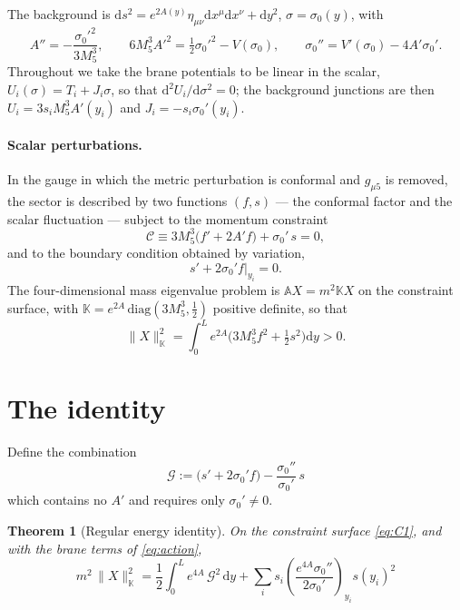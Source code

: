 \documentclass[11pt,a4paper]{article}
\newtheorem{theorem}{Theorem}
\newcommand{\Gcal}{\mathcal{G}}
\newcommand{\dd}{\mathrm{d}}
\newcommand{\sig}{\sigma_0}
\begin{document}
The background is
$\dd s^2=e^{2A(y)}\eta_{\mu\nu}\dd x^\mu \dd x^\nu+\dd y^2$,
$\sigma=\sig(y)$, with
\begin{equation}
A''=-\frac{\sig'^2}{3M_5^3},\qquad
6M_5^3A'^2=\tfrac12\sig'^2-V(\sig),\qquad
\sig''=V'(\sig)-4A'\sig' .
\label{eq:bg}
\end{equation}
Throughout we take the brane potentials to be linear in the scalar,
$U_i(\sigma)=T_i+J_i\sigma$, so that $\dd^2U_i/\dd\sigma^2=0$; the
background junctions are then
$U_i=3s_iM_5^3A'(y_i)$ and $J_i=-s_i\sig'(y_i)$.

\paragraph{Scalar perturbations.}
In the gauge in which the metric perturbation is conformal and
$g_{\mu5}$ is removed, the sector is described by two functions
$(f,s)$ --- the conformal factor and the scalar fluctuation --- subject
to the momentum constraint
\begin{equation}
\mathcal{C}\equiv 3M_5^3\big(f'+2A'f\big)+\sig'\,s=0,
\label{eq:C1}
\end{equation}
and to the boundary condition obtained by variation,
\begin{equation}
s'+2\sig'f\Big|_{y_i}=0 .
\label{eq:BC}
\end{equation}
The four-dimensional mass eigenvalue problem is
$\mathbb{A}X=m^2\mathbb{K}X$ on the constraint surface, with
$\mathbb{K}=e^{2A}\,\mathrm{diag}(3M_5^3,\tfrac12)$ positive definite,
so that
\begin{equation}
\|X\|^2_{\mathbb{K}}=\int_0^L e^{2A}\Big(3M_5^3f^2+\tfrac12 s^2\Big)\dd y>0 .
\label{eq:norm}
\end{equation}

\section{The identity}
\label{sec:identity}

Define the combination
\begin{equation}
\boxed{\;\Gcal:=\big(s'+2\sig'f\big)-\frac{\sig''}{\sig'}\,s\;}
\label{eq:G}
\end{equation}
which contains no $A'$ and requires only $\sig'\neq0$.

\begin{theorem}[Regular energy identity]
\label{thm:main}
On the constraint surface \eqref{eq:C1}, and with the brane terms of
\eqref{eq:action},
\begin{equation}
\boxed{\;
m^2\,\|X\|^2_{\mathbb{K}}
=\frac12\int_0^L e^{4A}\,\Gcal^2\,\dd y
+\sum_i s_i\left(\frac{e^{4A}\sig''}{2\sig'}\right)_{y_i} s(y_i)^2 \; }
\label{eq:main}
\end{equation}
\end{theorem}
\end{document}
